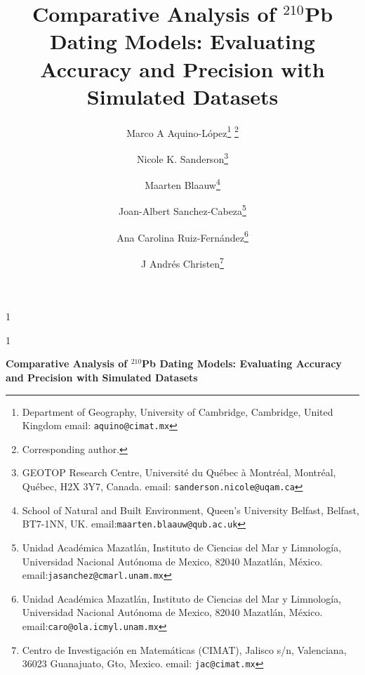 \documentclass [10pt] {article}
\date{ }
\newcommand{\blind}{1}
\newcommand{\papertitle}{
	Comparative Analysis of $^{210}$Pb Dating Models: Evaluating Accuracy and Precision with Simulated Datasets
}
\begin{document}
	\def\spacingset#1{\renewcommand{\baselinestretch}%
		{#1}\small\normalsize} \spacingset{1}
	\blind
	{
		\title{\textbf{\papertitle}}

		\author{Marco A Aquino-L\'opez\thanks{
				Department of Geography, University of Cambridge, 
				Cambridge, United Kingdom
				email: \texttt{aquino@cimat.mx} } \thanks{Corresponding author.}
					\and
			Nicole K. Sanderson\thanks{
				GEOTOP Research Centre, Université du Québec à Montréal, 
				Montréal, Québec, H2X 3Y7, Canada. 
				email: \texttt{sanderson.nicole@uqam.ca}}
					\and
			Maarten Blaauw\thanks{School of Natural and Built Environment,
				Queen's University Belfast,
				Belfast, BT7-1NN, UK.
				email:\texttt{maarten.blaauw@qub.ac.uk}  }
					\and
			Joan-Albert Sanchez-Cabeza\thanks{
				Unidad Acad\'emica Mazatl\'an, 
				Instituto de Ciencias del Mar y Limnolog\'ia, 
				Universidad Nacional Aut\'onoma de Mexico, 
				82040 Mazatl\'an, M\'exico.
				email:\texttt{jasanchez@cmarl.unam.mx}} 
					\and
			Ana Carolina Ruiz-Fernández\thanks{
				Unidad Acad\'emica Mazatl\'an, 
				Instituto de Ciencias del Mar y Limnolog\'ia, 
				Universidad Nacional Aut\'onoma de Mexico, 
				82040 Mazatl\'an, M\'exico.
				email:\texttt{caro@ola.icmyl.unam.mx}} 
					\and
			J Andr\'es Christen\thanks{
				Centro de Investigaci\'on en Matem\'aticas (CIMAT),
				Jalisco s/n, Valenciana, 36023 Guanajuato, Gto, Mexico.
				email: \texttt{jac@cimat.mx}  }
			}
		\maketitle
	} \fi

	\blind
	{
		\bigskip
		\bigskip
		\bigskip
		\begin{center}
			{\LARGE\bf \papertitle}
		\end{center}
		\medskip
	} \fi
\bigskip
\end{document}
